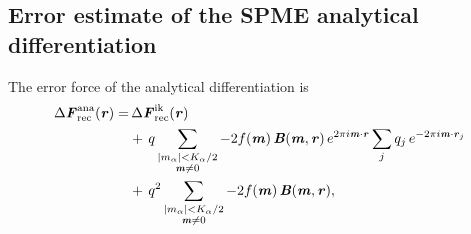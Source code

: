 \documentclass[aps,pre,preprint,unsortedaddress]{revtex4}
\renewcommand{\v}[1]{\textbf{\textit{#1}}}
\begin{document}
\subsection{Error estimate of the SPME analytical differentiation}
\label{sec:error-ana}

The error force of the analytical differentiation is 
\begin{align}\nonumber
  \Delta\v F_{\textrm{rec}}^{\textrm{ana}}(\v r)
  =&\,
  \Delta\v F_{\textrm{rec}}^{\textrm{ik}}(\v r)\\\nonumber
  & +\,
  q
  \sum_{
    \begin{subarray}{c}
      \vert m_{\alpha}\vert < K_\alpha/2\\
      \v m\neq 0
    \end{subarray}}
  -2f(\v m)\,
  \v B(\v m, \v r)\,e^{2\pi i\v m\cdot \v r}
  \sum_{j}q_j\,
  e^{-2\pi i\v m\cdot\v r_j} \\\label{eqn:ana.error.force}
  & +\,
  q^2
  \sum_{
    \begin{subarray}{c}
      \vert m_{\alpha}\vert < K_\alpha/2\\
      \v m\neq 0
    \end{subarray}}
  -2f(\v m)\,\v B(\v m, \v r),
\end{align}
\end{document}
